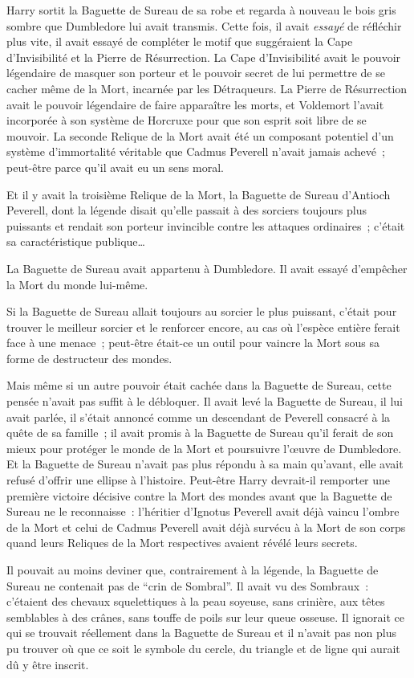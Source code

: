 Harry sortit la Baguette de Sureau de sa robe et regarda à nouveau le bois gris sombre que Dumbledore lui avait transmis. Cette fois, il avait \emph{essayé} de réfléchir plus vite, il avait essayé de compléter le motif que suggéraient la Cape d'Invisibilité et la Pierre de Résurrection. La Cape d'Invisibilité avait le pouvoir légendaire de masquer son porteur et le pouvoir secret de lui permettre de se cacher même de la Mort, incarnée par les Détraqueurs. La Pierre de Résurrection avait le pouvoir légendaire de faire apparaître les morts, et Voldemort l'avait incorporée à son système de Horcruxe pour que son esprit soit libre de se mouvoir. La seconde Relique de la Mort avait été un composant potentiel d'un système d'immortalité véritable que Cadmus Peverell n'avait jamais achevé~; peut-être parce qu'il avait eu un sens moral.

Et il y avait la troisième Relique de la Mort, la Baguette de Sureau d'Antioch Peverell, dont la légende disait qu'elle passait à des sorciers toujours plus puissants et rendait son porteur invincible contre les attaques ordinaires~; c'était sa caractéristique publique…

La Baguette de Sureau avait appartenu à Dumbledore. Il avait essayé d'empêcher la Mort du monde lui-même.

Si la Baguette de Sureau allait toujours au sorcier le plus puissant, c'était pour trouver le meilleur sorcier et le renforcer encore, au cas où l'espèce entière ferait face à une menace~; peut-être était-ce un outil pour vaincre la Mort sous sa forme de destructeur des mondes.

Mais même si un autre pouvoir était cachée dans la Baguette de Sureau, cette pensée n'avait pas suffit à le débloquer. Il avait levé la Baguette de Sureau, il lui avait parlée, il s'était annoncé comme un descendant de Peverell consacré à la quête de sa famille~; il avait promis à la Baguette de Sureau qu'il ferait de son mieux pour protéger le monde de la Mort et poursuivre l'œuvre de Dumbledore. Et la Baguette de Sureau n'avait pas plus répondu à sa main qu'avant, elle avait refusé d'offrir une ellipse à l'histoire. Peut-être Harry devrait-il remporter une première victoire décisive contre la Mort des mondes avant que la Baguette de Sureau ne le reconnaisse~: l'héritier d'Ignotus Peverell avait déjà vaincu l'ombre de la Mort et celui de Cadmus Peverell avait déjà survécu à la Mort de son corps quand leurs Reliques de la Mort respectives avaient révélé leurs secrets.

Il pouvait au moins deviner que, contrairement à la légende, la Baguette de Sureau ne contenait pas de “crin de Sombral”. Il avait vu des Sombraux~: c'étaient des chevaux squelettiques à la peau soyeuse, sans crinière, aux têtes semblables à des crânes, sans touffe de poils sur leur queue osseuse. Il ignorait ce qui se trouvait réellement dans la Baguette de Sureau et il n'avait pas non plus pu trouver où que ce soit le symbole du cercle, du triangle et de ligne qui aurait dû y être inscrit.

